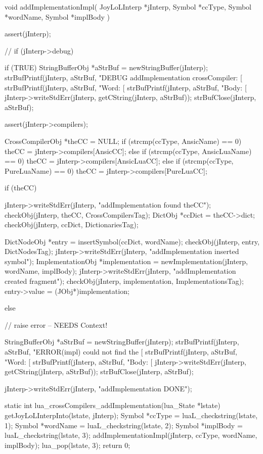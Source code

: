 \startCCode
void addImplementationImpl(
  JoyLoLInterp *jInterp,
  Symbol       *ccType,
  Symbol       *wordName,
  Symbol       *implBody
) {
  assert(jInterp);
  
//  if (jInterp->debug) {
  if (TRUE) {
    StringBufferObj *aStrBuf = newStringBuffer(jInterp);
    strBufPrintf(jInterp, aStrBuf, 
      "DEBUG addImplementation crossCompiler: [%
    strBufPrintf(jInterp, aStrBuf, "Word: [%
    strBufPrintf(jInterp, aStrBuf, "Body: [%
    jInterp->writeStdErr(jInterp, getCString(jInterp, aStrBuf));
    strBufClose(jInterp, aStrBuf);
  }
  
  assert(jInterp->compilers);

  CrossCompilerObj *theCC = NULL;
  if (strcmp(ccType, AnsicName) == 0) {
    theCC = jInterp->compilers[AnsicCC];
  } else if (strcmp(ccType, AnsicLuaName) == 0) {
    theCC = jInterp->compilers[AnsicLuaCC];
  } else if (strcmp(ccType, PureLuaName) == 0) {
    theCC = jInterp->compilers[PureLuaCC];
  }
  
  if (theCC) {
    jInterp->writeStdErr(jInterp, "addImplementation found theCC\n");
    checkObj(jInterp, theCC, CrossCompilersTag);
    DictObj *ccDict = theCC->dict;
    checkObj(jInterp, ccDict, DictionariesTag);
    
    DictNodeObj *entry    = insertSymbol(ccDict, wordName);
    checkObj(jInterp, entry, DictNodesTag);
    jInterp->writeStdErr(jInterp, "addImplementation inserted symbol\n");
    ImplementationObj *implementation =
      newImplementation(jInterp, wordName, implBody);
    jInterp->writeStdErr(jInterp, "addImplementation created fragment\n");
    checkObj(jInterp, implementation, ImplementationsTag);
    entry->value = (JObj*)implementation;
  } else {
    // raise error -- NEEDS Context!
    
    StringBufferObj *aStrBuf = newStringBuffer(jInterp);
    strBufPrintf(jInterp, aStrBuf, 
      "ERROR(impl) could not find the [%
    strBufPrintf(jInterp, aStrBuf, "Word: [%
    strBufPrintf(jInterp, aStrBuf, "Body: [%
    jInterp->writeStdErr(jInterp, getCString(jInterp, aStrBuf));
    strBufClose(jInterp, aStrBuf);
  }
  jInterp->writeStdErr(jInterp, "addImplementation DONE\n");
}

static int lua_crossCompilers_addImplementation(lua_State *lstate) {
  getJoyLoLInterpInto(lstate, jInterp);
  Symbol *ccType   = luaL_checkstring(lstate, 1);
  Symbol *wordName = luaL_checkstring(lstate, 2);
  Symbol *implBody = luaL_checkstring(lstate, 3);
  addImplementationImpl(jInterp, ccType, wordName, implBody);
  lua_pop(lstate, 3);
  return 0;
}
\stopCCode
\stopTestSuite

}
